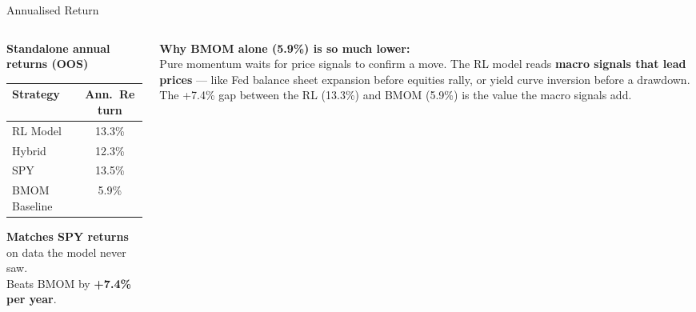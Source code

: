 \documentclass[aspectratio=169,11pt]{beamer}
\begin{document}
\begin{frame}{Annualised Return}
  \vspace{0.6em}
  \begin{columns}[T]
    \begin{column}{0.50\textwidth}
      \textbf{Standalone annual returns (OOS)}\\[0.4em]
      \begin{center}
      \begin{tabular}{lc}
        \toprule
        Strategy & Ann.\ Return \\
        \midrule
        \rowcolor{blue!8}
        RL Model        & 13.3\% \\
        Hybrid          & 12.3\% \\
        SPY             & 13.5\% \\
        BMOM Baseline   &  5.9\% \\
        \bottomrule
      \end{tabular}
      \end{center}
      \vspace{0.4em}
      \small \textbf{Matches SPY returns} on data the model never saw.\\
      Beats BMOM by \textbf{+7.4\% per year}.
    \end{column}
    \begin{column}{0.46\textwidth}
      \textbf{Why BMOM alone (5.9\%) is so much lower:}\\[0.4em]\normalsize
      Pure momentum waits for price signals to confirm a move. The RL model reads \textbf{macro signals that lead prices} --- like Fed balance sheet expansion before equities rally, or yield curve inversion before a drawdown.\\[0.5em]
      \small The +7.4\% gap between the RL (13.3\%) and BMOM (5.9\%) is the value the macro signals add.
    \end{column}
  \end{columns}
\end{frame}

\end{document}
